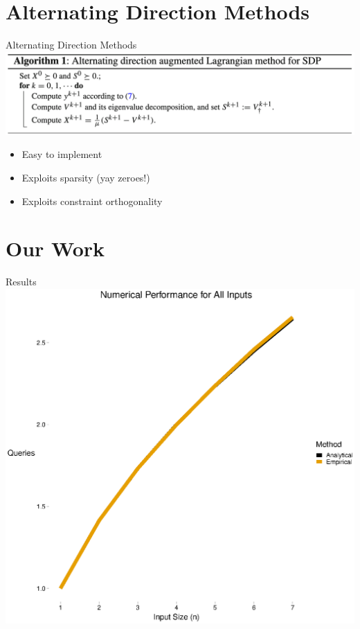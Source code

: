 \documentclass[12pt]{beamer}
\begin{document}
\section{Alternating Direction Methods}
\begin{frame}{Alternating Direction Methods \cite{adm}}
\centering
\includegraphics[scale=.15]{figures/adm_algorithm}
\bigskip
\begin{itemize}
    \item Easy to implement
    \item Exploits sparsity (yay zeroes!)
    \item Exploits constraint orthogonality
\end{itemize}
\end{frame}

\section{Our Work}
\begin{frame}{Results}
\centering
\includegraphics[scale=.5]{figure_all_or_complexity.eps}
\end{frame}
\end{document}

